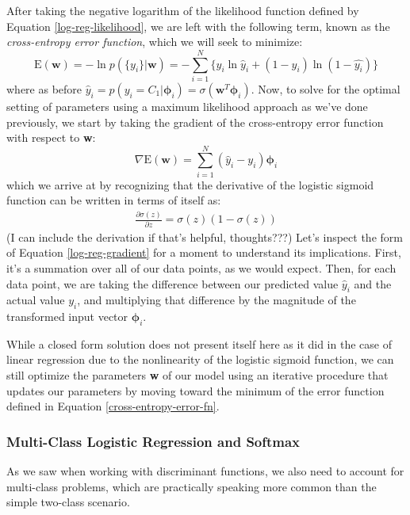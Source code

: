 After taking the negative logarithm of the likelihood function defined by Equation \ref{log-reg-likelihood}, we are left with the following term, known as the \textit{cross-entropy error function}, which we will seek to minimize:
\begin{equation} \label{cross-entropy-error-fn}
	\mathrm{E}(\textbf{w}) = - \ln{p(\{y_{i}\}|\textbf{w})} = - \sum_{i=1}^{N} \{y_{i}\ln{\hat{y}_i} + (1 - y_{i})\ln{(1-\hat{y_{i}})}\}
\end{equation}
where as before $\hat{y}_{i} = p(y_{i}=C_{1}|\boldsymbol{\phi}_{i}) = \sigma(\textbf{w}^{T}\boldsymbol{\phi}_{i})$. Now, to solve for the optimal setting of parameters using a maximum likelihood approach as we've done previously, we start by taking the gradient of the cross-entropy error function with respect to \textbf{w}:
\begin{equation} \label{log-reg-gradient}
	\nabla \mathrm{E}(\textbf{w}) = \sum_{i=1}^{N}(\hat{y}_{i} - y_{i})\boldsymbol{\phi}_{i}
\end{equation}
which we arrive at by recognizing that the derivative of the logistic sigmoid function can be written in terms of itself as:
\begin{align*}
	\frac{\partial \sigma(z)}{\partial z} = \sigma(z)(1 - \sigma(z))
\end{align*}
(I can include the derivation if that's helpful, thoughts???) Let's inspect the form of Equation \ref{log-reg-gradient} for a moment to understand its implications. First, it's a summation over all of our data points, as we would expect. Then, for each data point, we are taking the difference between our predicted value $\hat{y}_{i}$ and the actual value $y_{i}$, and multiplying that difference by the magnitude of the transformed input vector $\boldsymbol{\phi}_{i}$.

While a closed form solution does not present itself here as it did in the case of linear regression due to the nonlinearity of the logistic sigmoid function, we can still optimize the parameters \textbf{w} of our model using an iterative procedure that updates our parameters by moving toward the minimum of the error function defined in Equation \ref{cross-entropy-error-fn}.

\subsubsection{Multi-Class Logistic Regression and Softmax}
As we saw when working with discriminant functions, we also need to account for multi-class problems, which are practically speaking more common than the simple two-class scenario.

